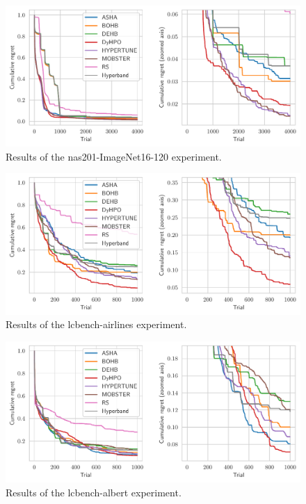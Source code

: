 \begin{figure}[H]
    \centering
    \includegraphics[scale=0.65]{img/tabular_exp/nas201-ImageNet16-120_plot.pdf}
    \caption{Results of the nas201-ImageNet16-120 experiment.}
\end{figure}

\begin{figure}[H]
    \centering
    \includegraphics[scale=0.65]{img/tabular_exp/lcbench-airlines_plot.pdf}
    \caption{Results of the lcbench-airlines experiment.}
\end{figure}

\begin{figure}[H]
    \centering
    \includegraphics[scale=0.65]{img/tabular_exp/lcbench-albert_plot.pdf}
    \caption{Results of the lcbench-albert experiment.}
\end{figure}

